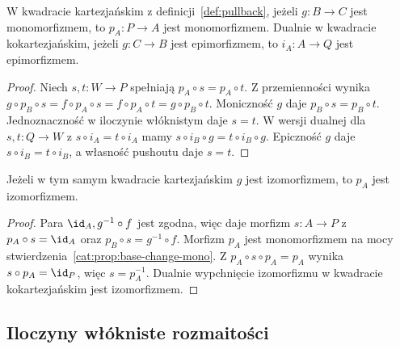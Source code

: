 \begin{stwierdzenie}\label{cat:prop:base-change-mono}
W kwadracie kartezjańskim z definicji~\ref{def:pullback}, jeżeli $g:B\to C$ jest monomorfizmem, to $p_A:P\to A$ jest monomorfizmem. Dualnie w kwadracie kokartezjańskim, jeżeli $g:C\to B$ jest epimorfizmem, to $i_A:A\to Q$ jest epimorfizmem.
\end{stwierdzenie}
\begin{proof}
Niech $s,t:W\to P$ spełniają $p_A\circ s=p_A\circ t$. Z przemienności wynika
$g\circ p_B\circ s=f\circ p_A\circ s=f\circ p_A\circ t=g\circ p_B\circ t$.
Moniczność $g$ daje $p_B\circ s=p_B\circ t$. Jednoznaczność w iloczynie włóknistym daje $s=t$. W wersji dualnej dla $s,t:Q\to W$ z $s\circ i_A=t\circ i_A$ mamy $s\circ i_B\circ g=t\circ i_B\circ g$. Epiczność $g$ daje $s\circ i_B=t\circ i_B$, a własność pushoutu daje $s=t$.
\end{proof}

\begin{stwierdzenie}\label{cat:prop:base-change-iso}
Jeżeli w tym samym kwadracie kartezjańskim $g$ jest izomorfizmem, to $p_A$ jest izomorfizmem.
\end{stwierdzenie}
\begin{proof}
Para $\id_A,g^{-1}\circ f$ jest zgodna, więc daje morfizm $s:A\to P$ z $p_A\circ s=\id_A$ oraz $p_B\circ s=g^{-1}\circ f$. Morfizm $p_A$ jest monomorfizmem na mocy stwierdzenia~\ref{cat:prop:base-change-mono}. Z $p_A\circ s\circ p_A=p_A$ wynika $s\circ p_A=\id_P$, więc $s=p_A^{-1}$. Dualnie wypchnięcie izomorfizmu w kwadracie kokartezjańskim jest izomorfizmem.
\end{proof}

\subsection{Iloczyny włókniste rozmaitości}

